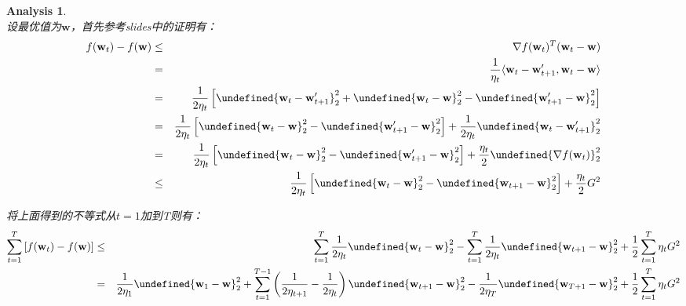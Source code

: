 \documentclass[a4paper,UTF8]{article}
\let\norm\undefined %
\DeclarePairedDelimiter\norm{\lVert}{\rVert}
\numberwithin{equation}{section}
\newtheorem*{myAnalysis}{Analysis}
\begin{document}
\begin{myAnalysis}~\\
设最优值为$\mathbf{w}$，首先参考slides中的证明有：
\begin{eqnarray*}
f(\mathbf{w}_t) - f(\mathbf{w}) &\le& \nabla f(\mathbf{w}_t) ^ T (\mathbf{w}_t - \mathbf{w}) \\
&=& \frac{1}{\eta_t} \langle \mathbf{w}_t - \mathbf{w}_{t+1}', \mathbf{w}_t - \mathbf{w} \rangle \\
&=& \frac{1}{2\eta_t} \left[ \norm{\mathbf{w}_t - \mathbf{w}_{t+1}'}_2^2 + \norm{\mathbf{w}_t - \mathbf{w}}_2^2 - \norm{\mathbf{w}_{t+1}' - \mathbf{w}}_2^2 \right] \\
&=& \frac{1}{2\eta_t} \left[ \norm{\mathbf{w}_t - \mathbf{w}}_2^2 - \norm{\mathbf{w}_{t+1}' - \mathbf{w}}_2^2 \right] + \frac{1}{2\eta_t} \norm{\mathbf{w}_t - \mathbf{w}_{t+1}'}_2^2 \\
&=& \frac{1}{2\eta_t} \left[ \norm{\mathbf{w}_t - \mathbf{w}}_2^2 - \norm{\mathbf{w}_{t+1}' - \mathbf{w}}_2^2 \right] + \frac{\eta_t}{2} \norm{\nabla f(\mathbf{w}_t)}_2^2 \\
&\le& \frac{1}{2\eta_t} \left[ \norm{\mathbf{w}_t - \mathbf{w}}_2^2 - \norm{\mathbf{w}_{t+1} - \mathbf{w}}_2^2 \right] + \frac{\eta_t}{2} G^2
\end{eqnarray*}

将上面得到的不等式从$t=1$加到T则有：
\begin{eqnarray*}
\sum_{t=1}^T \left[ f(\mathbf{w}_t) - f(\mathbf{w}) \right] &\le& \sum_{t=1}^T \frac{1}{2\eta_t} \norm{\mathbf{w}_t - \mathbf{w}}_2^2 - \sum_{t=1}^T \frac{1}{2\eta_t} \norm{\mathbf{w}_{t+1} - \mathbf{w}}_2^2 + \frac{1}{2} \sum_{t=1}^T \eta_t G^2 \\
&=& \frac{1}{2\eta_1} \norm{\mathbf{w}_1 - \mathbf{w}}_2^2 + \sum_{t=1}^{T - 1} \left( \frac{1}{2\eta_{t+1}} - \frac{1}{2\eta_t} \right) \norm{\mathbf{w}_{t+1} - \mathbf{w}}_2^2 - \frac{1}{2\eta_T}\norm{\mathbf{w}_{T+1} - \mathbf{w}}_2^2 + \frac{1}{2} \sum_{t=1}^T \eta_t G^2
\end{eqnarray*}


\end{myAnalysis}
\end{document}
